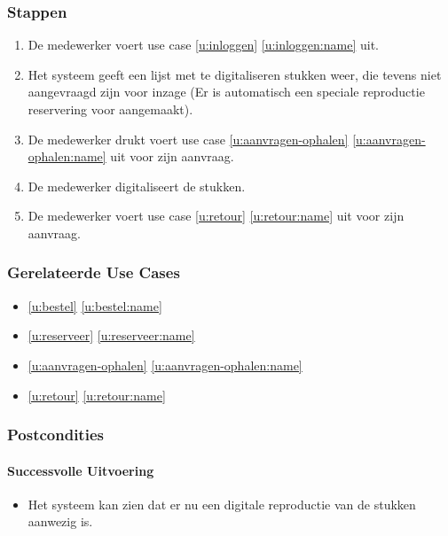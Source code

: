 \documentclass[a4paper,titlepage]{report}
\def\namedref#1{\ref{#1} \ref{#1:name}}
\begin{document}
      \subsubsection{Stappen}
        \begin{enumerate}
          \item De medewerker voert use case \namedref{u:inloggen}
            uit.
          \item Het systeem geeft een lijst met te digitaliseren stukken weer,
            die tevens niet aangevraagd zijn voor inzage (Er is automatisch
            een speciale reproductie reservering voor aangemaakt).
          \item De medewerker drukt voert use case
            \namedref{u:aanvragen-ophalen}
            uit voor zijn aanvraag.
          \item De medewerker digitaliseert de stukken.
          \item De medewerker voert use case \namedref{u:retour}
            uit voor zijn aanvraag.
        \end{enumerate}
      \subsubsection{Gerelateerde Use Cases}
        \begin{itemize}
          \item \namedref{u:bestel}
          \item \namedref{u:reserveer}
          \item \namedref{u:aanvragen-ophalen}
          \item \namedref{u:retour}
        \end{itemize}
      \subsubsection{Postcondities}
        \paragraph{Successvolle Uitvoering}
        \begin{itemize}
          \item Het systeem kan zien dat er nu een digitale reproductie van
            de stukken aanwezig is.
        \end{itemize}
\end{document}
